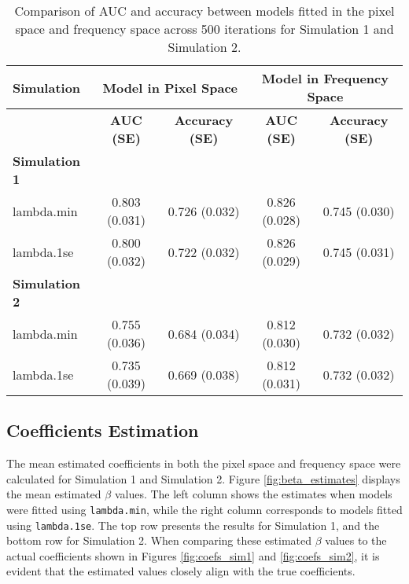 \documentclass[12pt]{article}
\begin{document}
\begin{table}[h!]
	\centering
	\caption{Comparison of AUC and accuracy between models fitted in the pixel space and frequency space across 500 iterations for Simulation 1 and Simulation 2.}
	\label{tab:auc_acc_table}
	\begin{tabular}{l|cc|cc}
		\toprule
		\textbf{Simulation}   & \multicolumn{2}{c}{\textbf{Model in Pixel Space}} & \multicolumn{2}{c}{\textbf{Model in Frequency Space}}                                              \\
		\midrule
		                      & \textbf{AUC (SE)}                                 & \textbf{Accuracy (SE)}                                & \textbf{AUC (SE)} & \textbf{Accuracy (SE)} \\
		\midrule
		\textbf{Simulation 1} &                                                   &                                                       &                   &                        \\
		lambda.min            & 0.803 (0.031)                                     & 0.726 (0.032)                                         & 0.826 (0.028)     & 0.745 (0.030)          \\
		lambda.1se            & 0.800 (0.032)                                     & 0.722 (0.032)                                         & 0.826 (0.029)     & 0.745 (0.031)          \\
		\midrule
		\textbf{Simulation 2} &                                                   &                                                       &                   &                        \\
		lambda.min            & 0.755 (0.036)                                     & 0.684 (0.034)                                         & 0.812 (0.030)     & 0.732 (0.032)          \\
		lambda.1se            & 0.735 (0.039)                                     & 0.669 (0.038)                                         & 0.812 (0.031)     & 0.732 (0.032)          \\
		\bottomrule
	\end{tabular}
\end{table}

\subsection*{Coefficients Estimation}

The mean estimated coefficients in both the pixel space and frequency space were calculated for Simulation 1 and Simulation 2. Figure \ref{fig:beta_estimates} displays the mean estimated \( \beta \) values. The left column shows the estimates when models were fitted using \texttt{lambda.min}, while the right column corresponds to models fitted using \texttt{lambda.1se}. The top row presents the results for Simulation 1, and the bottom row for Simulation 2. When comparing these estimated \( \beta \) values to the actual coefficients shown in Figures \ref{fig:coefs_sim1} and \ref{fig:coefs_sim2}, it is evident that the estimated values closely align with the true coefficients.
\end{document}
